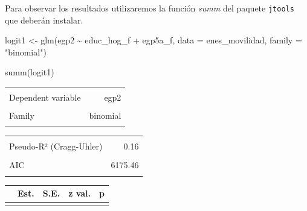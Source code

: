 \documentclass[
]{book}
\newenvironment{Shaded}{\begin{snugshade}}{\end{snugshade}}
\newcommand{\AttributeTok}[1]{\textcolor[rgb]{0.77,0.63,0.00}{#1}}
\newcommand{\FunctionTok}[1]{\textcolor[rgb]{0.00,0.00,0.00}{#1}}
\newcommand{\NormalTok}[1]{#1}
\newcommand{\OtherTok}[1]{\textcolor[rgb]{0.56,0.35,0.01}{#1}}
\newcommand{\SpecialCharTok}[1]{\textcolor[rgb]{0.00,0.00,0.00}{#1}}
\newcommand{\StringTok}[1]{\textcolor[rgb]{0.31,0.60,0.02}{#1}}
\begin{document}
Para observar los resultados utilizaremos la función \emph{summ} del paquete \texttt{jtools} que deberán instalar.

\begin{Shaded}
\begin{Highlighting}[]
\NormalTok{logit1 }\OtherTok{\textless{}{-}} \FunctionTok{glm}\NormalTok{(egp2 }\SpecialCharTok{\textasciitilde{}}\NormalTok{ educ\_hog\_f }\SpecialCharTok{+}\NormalTok{ egp5a\_f, }\AttributeTok{data =}\NormalTok{ enes\_movilidad, }\AttributeTok{family =} \StringTok{"binomial"}\NormalTok{)}

\FunctionTok{summ}\NormalTok{(logit1)}
\end{Highlighting}
\end{Shaded}

\begin{table}[!h]
\centering
\begin{tabular}{lr}
\toprule
\cellcolor{gray!6}{Observations} & \cellcolor{gray!6}{5907 (1553 missing obs. deleted)}\\
Dependent variable & egp2\\
\cellcolor{gray!6}{Type} & \cellcolor{gray!6}{Generalized linear model}\\
Family & binomial\\
\cellcolor{gray!6}{Link} & \cellcolor{gray!6}{logit}\\
\bottomrule
\end{tabular}
\end{table} \begin{table}[!h]
\centering
\begin{tabular}{lr}
\toprule
\cellcolor{gray!6}{$\chi^2$(6)} & \cellcolor{gray!6}{668.93}\\
Pseudo-R² (Cragg-Uhler) & 0.16\\
\cellcolor{gray!6}{Pseudo-R² (McFadden)} & \cellcolor{gray!6}{0.10}\\
AIC & 6175.46\\
\cellcolor{gray!6}{BIC} & \cellcolor{gray!6}{6222.24}\\
\bottomrule
\end{tabular}
\end{table} \begin{table}[!h]
\centering
\begin{threeparttable}
\begin{tabular}{lrrrr}
\toprule
  & Est. & S.E. & z val. & p\\
\midrule
\cellcolor{gray!6}{(Intercept)} & \cellcolor{gray!6}{-0.55} & \cellcolor{gray!6}{0.09} & \cellcolor{gray!6}{-6.08} & \cellcolor{gray!6}{0.00}\\

\end{tabular}
\end{threeparttable}
\end{table}
\end{document}
